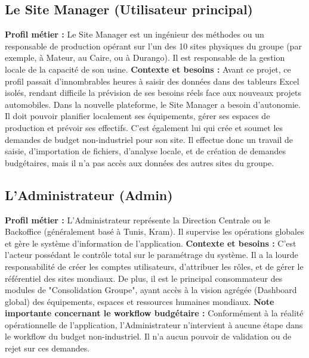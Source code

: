 \subsection{Le Site Manager (Utilisateur principal)}
\textbf{Profil métier :} Le Site Manager est un ingénieur des méthodes ou un responsable de production opérant sur l'un des 10 sites physiques du groupe (par exemple, à Mateur, au Caire, ou à Durango). Il est responsable de la gestion locale de la capacité de son usine.
\newline
\textbf{Contexte et besoins :} Avant ce projet, ce profil passait d'innombrables heures à saisir des données dans des tableurs Excel isolés, rendant difficile la prévision de ses besoins réels face aux nouveaux projets automobiles. Dans la nouvelle plateforme, le Site Manager a besoin d'autonomie. Il doit pouvoir planifier localement ses équipements, gérer ses espaces de production et prévoir ses effectifs. C'est également lui qui crée et soumet les demandes de budget non-industriel pour son site. Il effectue donc un travail de saisie, d'importation de fichiers, d'analyse locale, et de création de demandes budgétaires, mais il n'a pas accès aux données des autres sites du groupe.

\subsection{L'Administrateur (Admin)}
\textbf{Profil métier :} L'Administrateur représente la Direction Centrale ou le Backoffice (généralement basé à Tunis, Kram). Il supervise les opérations globales et gère le système d'information de l'application.
\newline
\textbf{Contexte et besoins :} C'est l'acteur possédant le contrôle total sur le paramétrage du système. Il a la lourde responsabilité de créer les comptes utilisateurs, d'attribuer les rôles, et de gérer le référentiel des sites mondiaux. De plus, il est le principal consommateur des modules de "Consolidation Groupe", ayant accès à la vision agrégée (Dashboard global) des équipements, espaces et ressources humaines mondiaux. \textbf{Note importante concernant le workflow budgétaire :} Conformément à la réalité opérationnelle de l'application, l'Administrateur n'intervient à aucune étape dans le workflow du budget non-industriel. Il n'a aucun pouvoir de validation ou de rejet sur ces demandes.


